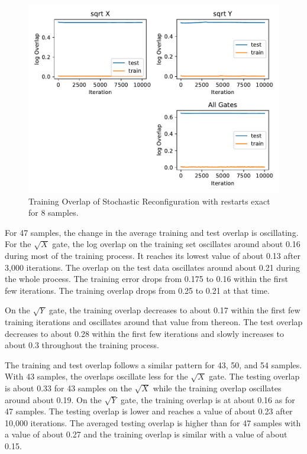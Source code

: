 \begin{figure}[H]
  \centering
  \includegraphics[width=\textwidth]{figures/results/SR-restarts-not-learned/avgOverlap_8.pdf}
  \caption[Training overlap of Stochastic Reconfiguration with restarts exact]{Training 
  Overlap of Stochastic Reconfiguration with restarts exact for 8 samples.}
  \label{fig:sr_exact_overlap_8}
\end{figure}

For 47 samples, the change in the average training and test overlap is oscillating. For the 
$\sqrt{X}$ gate, the log overlap on the training set oscillates around about 0.16 during most 
of the training process. It 
reaches its lowest value of about 0.13 after 3,000 iterations. The overlap on the test data 
oscillates around about 0.21 during the whole process. The training error drops from 
0.175 to 0.16 within the first few iterations. The training overlap drops from 0.25 to 0.21 at that time.

On the $\sqrt{Y}$ gate, the training overlap decreases to about 0.17 within the first few training iterations 
and oscillates around that value from thereon. The test overlap decreases to about 0.28 within the first few
iterations and slowly increases to about 0.3 throughout the training process.

The training and test overlap follows a similar pattern for 43, 50, and 54 samples.
With 43 samples, the overlaps oscillate less for the $\sqrt{X}$ gate. The testing overlap is about 
0.33 for 43 samples on the $\sqrt{X}$ while the training overlap oscillates around about 0.19.
On the $\sqrt{Y}$ gate, the training overlap is at about 0.16 as for 47 samples. The testing overlap is 
lower and reaches a value of about 0.23 after 10,000 iterations. The averaged testing overlap is higher than 
for 47 samples with a value of about 0.27 and the training overlap is similar with a value of about 0.15.

